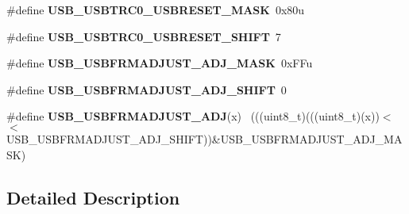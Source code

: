 \begin{DoxyCompactItemize}
\item 
\hypertarget{group___u_s_b___register___masks_ga3b307f8358be6942775121b6a92243ab}{}\#define {\bfseries U\+S\+B\+\_\+\+U\+S\+B\+T\+R\+C0\+\_\+\+U\+S\+B\+R\+E\+S\+E\+T\+\_\+\+M\+A\+S\+K}~0x80u\label{group___u_s_b___register___masks_ga3b307f8358be6942775121b6a92243ab}

\item 
\hypertarget{group___u_s_b___register___masks_gab20fcb9276a34cbbd33ac0364c419f13}{}\#define {\bfseries U\+S\+B\+\_\+\+U\+S\+B\+T\+R\+C0\+\_\+\+U\+S\+B\+R\+E\+S\+E\+T\+\_\+\+S\+H\+I\+F\+T}~7\label{group___u_s_b___register___masks_gab20fcb9276a34cbbd33ac0364c419f13}

\item 
\hypertarget{group___u_s_b___register___masks_ga3bbdc3dbdf46947a16a7b4429ad9a0c7}{}\#define {\bfseries U\+S\+B\+\_\+\+U\+S\+B\+F\+R\+M\+A\+D\+J\+U\+S\+T\+\_\+\+A\+D\+J\+\_\+\+M\+A\+S\+K}~0x\+F\+Fu\label{group___u_s_b___register___masks_ga3bbdc3dbdf46947a16a7b4429ad9a0c7}

\item 
\hypertarget{group___u_s_b___register___masks_ga81985f8c59f9aa0c0340a70136b55098}{}\#define {\bfseries U\+S\+B\+\_\+\+U\+S\+B\+F\+R\+M\+A\+D\+J\+U\+S\+T\+\_\+\+A\+D\+J\+\_\+\+S\+H\+I\+F\+T}~0\label{group___u_s_b___register___masks_ga81985f8c59f9aa0c0340a70136b55098}

\item 
\hypertarget{group___u_s_b___register___masks_gaf720ebb728601eb6b28984ed63b88b78}{}\#define {\bfseries U\+S\+B\+\_\+\+U\+S\+B\+F\+R\+M\+A\+D\+J\+U\+S\+T\+\_\+\+A\+D\+J}(x)                                ~(((uint8\+\_\+t)(((uint8\+\_\+t)(x))$<$$<$U\+S\+B\+\_\+\+U\+S\+B\+F\+R\+M\+A\+D\+J\+U\+S\+T\+\_\+\+A\+D\+J\+\_\+\+S\+H\+I\+F\+T))\&U\+S\+B\+\_\+\+U\+S\+B\+F\+R\+M\+A\+D\+J\+U\+S\+T\+\_\+\+A\+D\+J\+\_\+\+M\+A\+S\+K)\label{group___u_s_b___register___masks_gaf720ebb728601eb6b28984ed63b88b78}

\end{DoxyCompactItemize}


\subsection{Detailed Description}
